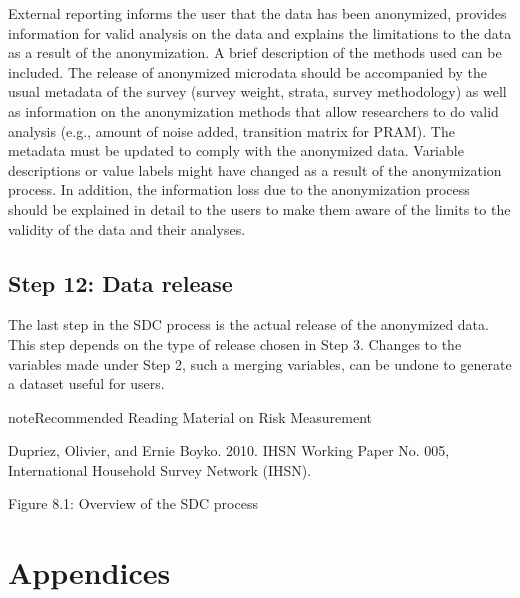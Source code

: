 \documentclass[letterpaper,10pt,english]{sphinxmanual}
\begin{document}
External reporting informs the user that the data has been anonymized,
provides information for valid analysis on the data and explains the
limitations to the data as a result of the anonymization. A brief
description of the methods used can be included. The release of
anonymized microdata should be accompanied by the usual metadata of the
survey (survey weight, strata, survey methodology) as well as
information on the anonymization methods that allow researchers to do
valid analysis (e.g., amount of noise added, transition matrix for
PRAM).  The
metadata must be updated to comply with the anonymized data. Variable
descriptions or value labels might have changed as a result of the
anonymization process. In addition, the information loss due to the
anonymization process should be explained in detail to the users to make
them aware of the limits to the validity of the data and their analyses.


\section{Step 12: Data release}
\label{\detokenize{process:step-12-data-release}}
The last step in the SDC process is the actual release of the anonymized
data. This step depends on the type of release chosen in Step 3. Changes
to the variables made under Step 2, such a merging variables, can be
undone to generate a dataset useful for users.

\begin{sphinxadmonition}{note}{Recommended Reading Material on Risk Measurement}

Dupriez, Olivier, and Ernie Boyko. 2010.  IHSN Working Paper No.
005, International Household Survey Network (IHSN).
\end{sphinxadmonition}

\noindent{}

Figure 8.1: Overview of the SDC process


\chapter{Appendices}
\label{\detokenize{appendices::doc}}\label{\detokenize{appendices:appendices}}
\end{document}
